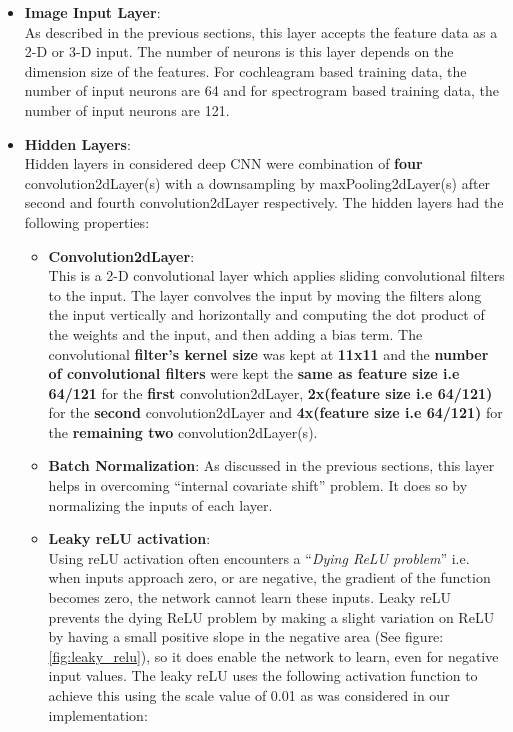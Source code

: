 \begin{itemize}
\item \textbf{Image Input Layer}:\\
As described in the previous sections, this layer accepts the feature data as a 2-D or 3-D input. The number of neurons is this layer depends on the dimension size of the features. For cochleagram based training data, the number of input neurons are 64 and for spectrogram based training data, the number of input neurons are 121.

\item \textbf{Hidden Layers}:\\
Hidden layers in considered deep CNN were combination of \textbf{four} convolution2dLayer(s) with a downsampling by maxPooling2dLayer(s) after second and fourth convolution2dLayer respectively. The hidden layers had the following properties:
\begin{itemize}
\item \textbf{Convolution2dLayer}:\\
This is a 2-D convolutional layer which applies sliding convolutional filters to the input. The layer convolves the input by moving the filters along the input vertically and horizontally and computing the dot product of the weights and the input, and then adding a bias term. The convolutional \textbf{filter's kernel size} was kept at \textbf{11x11} and the \textbf{number of convolutional filters} were kept the \textbf{same as feature size i.e 64/121} for the \textbf{first} convolution2dLayer, \textbf{2x(feature size i.e 64/121)} for the \textbf{second} convolution2dLayer and \textbf{4x(feature size i.e 64/121)} for the \textbf{remaining two} convolution2dLayer(s).
\item \textbf{Batch Normalization}:
As discussed in the previous sections, this layer helps in overcoming “internal covariate shift” problem. It does so by normalizing the inputs of each layer.
\item \textbf{Leaky reLU activation}:\\
Using reLU activation often encounters a \enquote{\textit{Dying ReLU problem}} i.e. when inputs approach zero, or are negative, the gradient of the function becomes zero, the network cannot learn these inputs. Leaky reLU prevents the dying ReLU problem by making a slight variation on ReLU by having a small positive slope in the negative area (See figure: \ref{fig:leaky_relu}), so it does enable the network to learn, even for negative input values. The leaky reLU uses the following activation function to achieve this using the scale value of 0.01 as was considered in our implementation:

\end{itemize}
\end{itemize}
